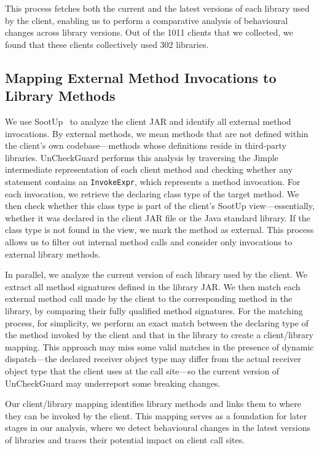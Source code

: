 This process fetches both the current and the latest versions of each library used by the client, enabling us to perform a comparative analysis of behavioural changes across library versions. Out of the 1011 clients that we collected, we found that these clients collectively used 302 libraries.

\subsection{Mapping External Method Invocations to Library Methods}

We use SootUp~\cite{Karakaya24:_SootUp} to analyze the client JAR and identify all external method invocations. By external methods, we mean methods that are not defined within the client’s own codebase—methods whose definitions reside in third-party libraries. UnCheckGuard performs this analysis by traversing the Jimple intermediate representation of each client method and checking whether any statement contains an \texttt{InvokeExpr}, which represents a method invocation. For each invocation, we retrieve the declaring class type of the target method. We then check whether this class type is part of the client’s SootUp view---essentially, whether it was declared in the client JAR file or the Java standard library. If the class type is not found in the view, we mark the method as external. This process allows us to filter out internal method calls and consider only invocations to external library methods.

In parallel, we analyze the current version of each library used by the client. We extract all method signatures defined in the library JAR. We then match each external method call made by the client to the corresponding method in the library, by comparing their fully qualified method signatures. For the matching process, for simplicity, we perform an exact match between the declaring type of the method invoked by the client and that in the library to create a client/library mapping. This approach may miss some valid matches in the presence of dynamic dispatch---the declared receiver object type may differ from the actual receiver object type that the client uses at the call site---so the current version of UnCheckGuard may underreport some breaking changes.

Our client/library mapping identifies library methods and links them to where they can be invoked by the client. This mapping serves as a foundation for later stages in our analysis, where we detect behavioural changes in the latest versions of libraries and traces their potential impact on client call sites.


